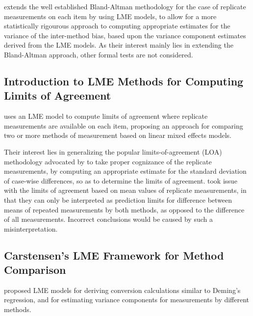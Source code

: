\documentclass[12pt, a4paper]{report}
\theoremstyle{plain}
\theoremstyle{definition}
\theoremstyle{remark}
\begin{document}
	
	\citet{BXC2008} extends the well established Bland-Altman methodology for the case of replicate measurements on each item by using LME models, to allow for a more statistically rigourous approach to computing appropriate estimates for the variance of the inter-method bias, based upon the variance component estimates derived from the LME models. As their interest mainly lies in extending the Bland-Altman approach, other formal tests are not considered.
	
	
	
	
	\subsection{Introduction to LME Methods for Computing Limits of Agreement}

	\citet{BXC2004,BXC2008} uses an LME model to compute limits of agreement where replicate measurements are available on each item, proposing an approach for comparing two or more methods of measurement based on linear mixed effects models.
	
	Their interest lies in generalizing the popular limits-of-agreement (LOA) methodology advocated by \citet{BA86} to take proper cognizance of the replicate measurements, by computing an appropriate estimate for the standard deviation of case-wise differences, so as to determine the limits of agreement.
		\citet{BXC2008} took issue with the limits of agreement based on mean values of replicate measurements, in that they can only be interpreted as prediction limits for difference between means of repeated measurements by both methods, as opposed to the difference of all measurements.
	Incorrect conclusions would be caused by such a misinterpretation.
	
	
	
	\subsection{Carstensen's LME Framework for Method Comparison}
	
		\citet{BXC2004} proposed LME models for deriving conversion calculations similar to Deming's regression, and for
	estimating variance components for measurements by different methods.
	
\end{document}
